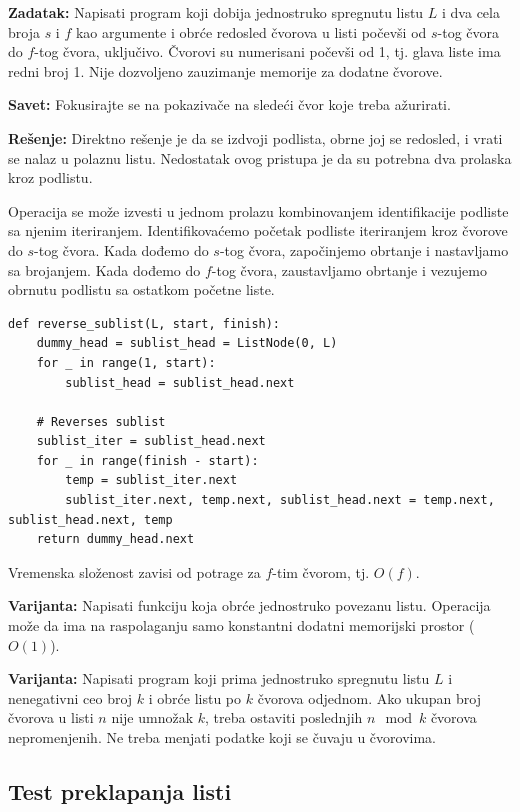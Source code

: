 \documentclass[11pt,a4paper]{article}
\begin{document}
\textbf{Zadatak:} Napisati program koji dobija jednostruko spregnutu listu $L$ i
dva cela broja $s$ i $f$ kao argumente i obrće redosled čvorova u listi počevši
od $s$-tog čvora do $f$-tog čvora, uključivo. Čvorovi su numerisani počevši od
1, tj. glava liste ima redni broj 1. Nije dozvoljeno zauzimanje memorije za
dodatne čvorove.

\textbf{Savet:} Fokusirajte se na pokazivače na sledeći čvor koje treba
ažurirati.

\textbf{Rešenje:} Direktno rešenje je da se izdvoji podlista, obrne joj se
redosled, i vrati se nalaz u polaznu listu. Nedostatak ovog pristupa je da su
potrebna dva prolaska kroz podlistu.

Operacija se može izvesti u jednom prolazu kombinovanjem identifikacije podliste
sa njenim iteriranjem. Identifikovaćemo početak podliste iteriranjem kroz
čvorove do $s$-tog čvora. Kada dođemo do $s$-tog čvora, započinjemo obrtanje i
nastavljamo sa brojanjem. Kada dođemo do $f$-tog čvora, zaustavljamo obrtanje i
vezujemo obrnutu podlistu sa ostatkom početne liste.

\begin{verbatim}
def reverse_sublist(L, start, finish): 
    dummy_head = sublist_head = ListNode(0, L) 
    for _ in range(1, start):
        sublist_head = sublist_head.next

    # Reverses sublist
    sublist_iter = sublist_head.next 
    for _ in range(finish - start):
        temp = sublist_iter.next
        sublist_iter.next, temp.next, sublist_head.next = temp.next, sublist_head.next, temp
    return dummy_head.next  
\end{verbatim}  

Vremenska složenost zavisi od potrage za $f$-tim čvorom, tj. $O(f)$.

\textbf{Varijanta:} Napisati funkciju koja obrće jednostruko povezanu listu.
Operacija može da ima na raspolaganju samo konstantni dodatni memorijski prostor
($O(1)$).

\textbf{Varijanta:} Napisati program koji prima jednostruko spregnutu listu $L$
i nenegativni ceo broj $k$ i obrće listu po $k$ čvorova odjednom. Ako ukupan
broj čvorova u listi $n$ nije umnožak $k$, treba ostaviti poslednjih $n\mod k$
čvorova nepromenjenih. Ne treba menjati podatke koji se čuvaju u čvorovima.

\subsection{Test preklapanja listi}
\end{document}
